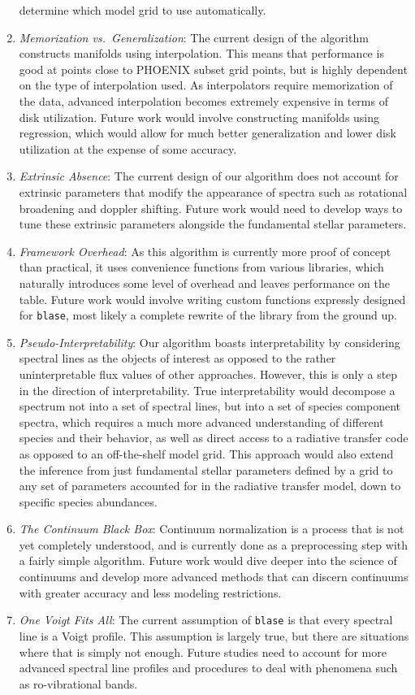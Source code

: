 \documentclass[twocolumn]{aastex631}
\begin{document}
\begin{enumerate}[label=-]
    determine which model grid to use automatically.
    \item \textit{Memorization vs.\ Generalization}: The current design of
    the algorithm constructs manifolds using interpolation. This means that
    performance is good at points close to PHOENIX subset grid points, but
    is highly dependent on the type of interpolation used. As interpolators
    require memorization of the data, advanced interpolation becomes extremely
    expensive in terms of disk utilization. Future work would involve 
    constructing manifolds using regression, which would allow for much
    better generalization and lower disk utilization at the expense of
    some accuracy.
    \item \textit{Extrinsic Absence}: The current design of our algorithm
    does not account for extrinsic parameters that modify the appearance of 
    spectra such as rotational broadening and doppler shifting. Future work
    would need to develop ways to tune these extrinsic parameters alongside
    the fundamental stellar parameters.
    \item \textit{Framework Overhead}: As this algorithm is currently more 
    proof of concept than practical, it uses convenience functions from 
    various libraries, which naturally introduces some level of overhead and 
    leaves performance on the table. Future work would involve writing 
    custom functions expressly designed for \texttt{blase}, most likely a 
    complete rewrite of the library from the ground up.
    \item \textit{Pseudo-Interpretability}: Our algorithm boasts interpretability
    by considering spectral lines as the objects of interest as opposed to 
    the rather uninterpretable flux values of other approaches. However, this
    is only a step in the direction of interpretability. True interpretability
    would decompose a spectrum not into a set of spectral lines, but into a
    set of species component spectra, which requires a much more advanced 
    understanding of different species and their behavior, as well as
    direct access to a radiative transfer code as opposed to an off-the-shelf
    model grid. This approach would also extend the inference from just
    fundamental stellar parameters defined by a grid to any set of parameters
    accounted for in the radiative transfer model, down to specific species
    abundances.
    \item \textit{The Continuum Black Box}: Continuum normalization is a
    process that is not yet completely understood, and is currently done as 
    a preprocessing step with a fairly simple algorithm. Future work would
    dive deeper into the science of continuums and develop more advanced 
    methods that can discern continuums with greater accuracy and less
    modeling restrictions.
    \item \textit{One Voigt Fits All}: The current assumption of \texttt{blase}
    is that every spectral line is a Voigt profile. This assumption is largely
    true, but there are situations where that is simply not enough. Future
    studies need to account for more advanced spectral line profiles and 
    procedures to deal with phenomena such as ro-vibrational bands.
\end{enumerate}
\end{document}
